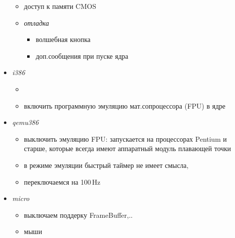 \begin{itemize}
\begin{itemize}
\item {} доступ к памяти CMOS

\item \emph{отладка}
  \begin{itemize}
\item {} волшебная кнопка 
\item {} доп.сообщения при пуске ядра
  \end{itemize}

  \end{itemize}

  \item {} \emph{i386} 

\begin{itemize}
  \item {}
  \item {} включить программную эмуляцию мат.сопроцессора
  (FPU) в ядре
\end{itemize}

  \item {} \emph{qemu386} 

\begin{itemize}
\item {} выключить эмуляцию FPU:  запускается
на процессорах Pentium и старше, которые всегда имеют аппаратный модуль
плавающей точки
\item {}  в режиме эмуляции быстрый таймер не
имеет смысла,

\item {} переключаемся на 100\,Hz
\end{itemize}

\item {} \emph{micro}

\begin{itemize}
\item {} выключаем поддерку FrameBuffer,..
\item {} мыши
\end{itemize}

\end{itemize}

 \label{azulibc}


